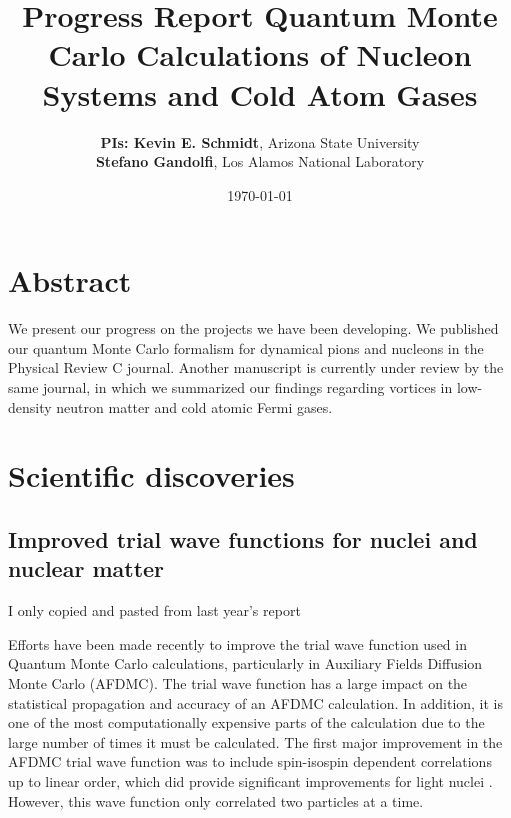 \documentclass[12pt,letterpaper]{article}
\newcommand{\project}{\large Progress Report \vskip 0.1cm}
\begin{document}
\onehalfspacing
\title{\project {\Large \textbf{Quantum Monte Carlo Calculations of Nucleon 
Systems and Cold Atom Gases}} \vspace{-0.5cm}}
\author{
{\bf PIs: Kevin E. Schmidt}, Arizona State University \\
{\bf Stefano Gandolfi}, Los Alamos National Laboratory
}
\date{\today}
\maketitle

\vspace{-1.5cm}
\section*{Abstract}

We present our progress on the projects we have been developing.
We published our
quantum Monte Carlo formalism for dynamical pions and nucleons
in the
Physical 
Review C journal.
Another manuscript is currently under review by the same journal,
in which
we summarized
our findings regarding vortices in low-density neutron matter
and cold atomic Fermi gases.

\section{Scientific discoveries}%

\subsection{Improved trial wave functions for nuclei and nuclear matter}

{\color{red} I only copied and pasted from last year's report}

Efforts have been made recently to improve the trial wave function used in Quantum Monte Carlo calculations, particularly in Auxiliary Fields Diffusion Monte Carlo (AFDMC). The trial wave function has a large impact on the statistical propagation and accuracy of an AFDMC calculation. In addition, it is one of the most computationally expensive parts of the calculation due to the large number of times it must be calculated. The first major improvement in the AFDMC trial wave function was to include spin-isospin dependent correlations up to linear order, which did provide significant improvements for light nuclei \cite{gan14}. However, this wave function only correlated two particles at a time.
\end{document}
